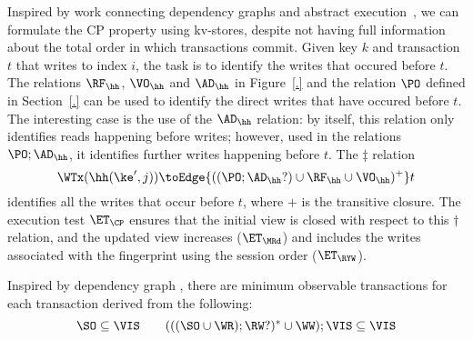 Inspired by work connecting dependency graphs and abstract execution~\cite{laws}, 
we can formulate the CP property using kv-stores, despite not having
full information about the total order in which transactions commit.
Given key $k$ and transaction $t$ that writes to index $i$, the task
is to identify the writes that occured before $t$. The relations
$\RF_{\hh}$, $\VO_{\hh}$ and $\AD_{\hh} $ in Figure~\ref{.} and the
relation $\PO$ defined in Section~\ref{.}  can be used to identify
the direct writes that have occured before $t$. The interesting
case is the use of the $\AD_{\hh}$ relation: by itself, this relation
only identifies reads happening before writes; however, used in the
relations $\PO ;
\AD_{\hh}$, it identifies further  writes happening
before $t$. The $\ddagger$ relation
\[
\WTx(\hh(\ke', j)) \toEdge{((\PO ; \AD_{\hh}? )\cup \RF_{\hh} \cup \VO_{\hh})^{+}} t
\]
identifies all the writes that occur before $t$, where $+$ is the
transitive closure. 
The execution test $\ET_{\CP}$ ensures that the initial view is 
closed with respect to this $\dagger$  relation, and the updated view 
increases ($ \ET_\MRd $) and 
includes the writes associated with the fingerprint using the
session order ($\ET_\RYW $).





Inspired by dependency graph \cite{.....},
there are minimum observable transactions for each transaction derived from the following:
\[
    \SO  \subseteq  \VIS \qquad
    ( ( ( \SO \cup \WR ) ; \RW? )^* \cup \WW ) ; \VIS \subseteq \VIS
\]

